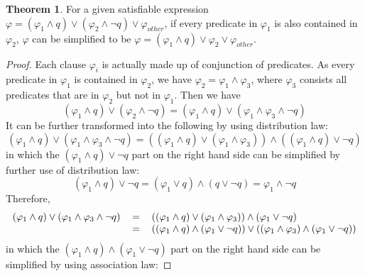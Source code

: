 \documentclass[10pt,journal,final,]{article}
\theoremstyle{definition}
\newtheorem{theorem}{Theorem}[section]
\begin{document}
\begin{theorem}
For a given satisfiable expression $\varphi = (\varphi _{1} \wedge q) \vee (\varphi _{2} \wedge \neg q) \vee \varphi _{other}$, if every predicate in $\varphi _{1}$ is also contained in $\varphi _{2}$,
$\varphi$ can be simplified to be $\varphi = (\varphi _{1} \wedge q) \vee \varphi _{2} \vee \varphi _{other}$.
\end{theorem}
\begin{proof}
Each clause $\varphi _{i}$ is actually made up of conjunction of predicates. As every predicate in $\varphi _{1}$ is contained in $\varphi _{2}$, we have $\varphi _{2} = \varphi _{1} \wedge \varphi _{3}$,
where $\varphi _{3}$ consists all predicates that are in $\varphi _{2}$ but not in $\varphi _{1}$. Then we have
\begin{equation}
(\varphi _{1} \wedge q) \vee (\varphi _{2} \wedge \neg q) = (\varphi _{1} \wedge q) \vee (\varphi _{1} \wedge \varphi _{3} \wedge \neg q)
\end{equation}
It can be further transformed into the following by using distribution law:
\begin{equation}
(\varphi _{1} \wedge q) \vee (\varphi _{1} \wedge \varphi _{3} \wedge \neg q) = ((\varphi _{1} \wedge q) \vee (\varphi _{1} \wedge \varphi _{3})) \wedge ((\varphi _{1} \wedge q) \vee \neg q)
\end{equation}
in which the $(\varphi _{1} \wedge q) \vee \neg q$ part on the right hand side can be simplified by further use of distribution law:
\begin{equation}
(\varphi _{1} \wedge q) \vee \neg q = (\varphi _{1} \vee q) \wedge (q \vee \neg q) = \varphi _{1} \wedge \neg q
\end{equation}
Therefore,
\begin{equation}
\begin{tabular}{rcl}
$(\varphi _{1} \wedge q) \vee (\varphi _{1} \wedge \varphi _{3} \wedge \neg q)$&$=$&$((\varphi _{1} \wedge q) \vee (\varphi _{1} \wedge \varphi _{3})) \wedge (\varphi _{1} \vee \neg q)$ \\
                                                                               &$=$&$((\varphi _{1} \wedge q) \wedge (\varphi _{1} \vee \neg q)) \vee ((\varphi _{1} \wedge \varphi _{3}) \wedge (\varphi _{1} \vee \neg q))$ \\
\end{tabular}
\end{equation}
in which the $(\varphi _{1} \wedge q) \wedge (\varphi _{1} \vee \neg q)$ part on the right hand side can be simplified by using association law:

\end{proof}
\end{document}
